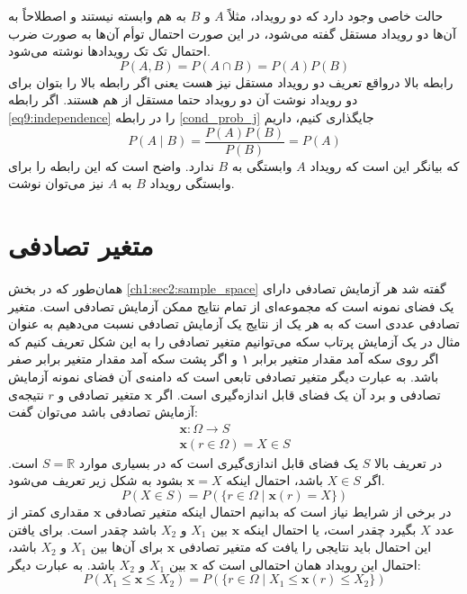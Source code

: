 حالت خاصی وجود دارد که دو رویداد، مثلاً $A$ و $B$ به هم وابسته نیستند و اصطلاحاً به آن‌ها دو رویداد مستقل گفته می‌شود، در این صورت احتمال توأم آن‌ها به صورت ضرب احتمال تک تک رویدادها نوشته می‌شود.
\begin{equation}
    P(A,B) = P(A \cap B) = P(A)P(B)
    \label{eq9:independence}
\end{equation}
رابطه بالا در‌واقع تعریف دو رویداد مستقل نیز هست یعنی اگر رابطه بالا را بتوان برای دو رویداد نوشت آن دو رویداد حتما مستقل از هم هستند. اگر رابطه \ref{eq9:independence} را در رابطه \ref{cond_prob_j} جایگذاری کنیم، داریم
$$P(A \mid B) = \frac{P(A)P(B)}{P(B)} = P(A)$$
که بیانگر این است که رویداد $A$ وابستگی به $B$ ندارد. واضح است که این رابطه را برای وابستگی رویداد $‌B$ به $A$ نیز می‌توان نوشت.\cite{taylor_introduction_1998}


\section{متغیر تصادفی}
\label{ch1:sec5:random_variable}

همان‌طور که در بخش \ref{ch1:sec2:sample_space} گفته شد هر آزمایش تصادفی دارای یک فضای نمونه است که مجموعه‌ای از تمام نتایج ممکن آزمایش تصادفی است. متغیر تصادفی عددی است که به هر یک از نتایج یک آزمایش تصادفی نسبت می‌دهیم به عنوان مثال در یک آزمایش پرتاب سکه می‌توانیم متغیر تصادفی را به این شکل تعریف کنیم که اگر روی سکه آمد مقدار متغیر برابر ۱ و اگر پشت سکه آمد مقدار متغیر برابر صفر باشد.
به عبارت دیگر متغیر تصادفی تابعی است که دامنه‌ی آن فضای نمونه آزمایش تصادفی و برد آن یک فضای قابل اندازه‌گیری است. اگر $\mathbf{x}$ متغیر تصادفی و $r$ نتیجه‌ی آزمایش تصادفی باشد می‌توان گفت:
$$
\begin{array}{l}
    \mathbf{x}:\Omega \rightarrow S \\
    \mathbf{x}(r\in \Omega) = X \in S
\end{array}
$$
در تعریف بالا $S$ یک فضای قابل اندازی‌گیری است که در بسیاری موارد $S=\mathbb{R}$ است. اگر $X \in S$ باشد، احتمال اینکه $\mathbf{x}=X$ بشود به شکل زیر تعریف می‌شود.
$$
P(X \in S) = P(\{ r \in \Omega \mid \mathbf{x}(r) = X \})
$$
در برخی از شرایط نیاز است که بدانیم احتمال اینکه متغیر تصادفی $\mathbf{x}$ مقداری کمتر از عدد $X$ بگیرد چقدر است، یا احتمال اینکه $\mathbf{x}$ بین $X_1$ و $X_2$ باشد چقدر است. برای یافتن این احتمال باید نتایجی را یافت که متغیر تصادفی $\mathbf{x}$ برای آن‌ها بین $X_1$ و $X_2$ باشد، احتمال این رویداد همان احتمالی است که $\mathbf{x}$ بین $X_1$ و $X_2$ باشد. به عبارت دیگر:
$$
P(X_1 \leq \mathbf{x} \leq X_2) = P(\{ r \in \Omega  \mid X_1 \leq  \mathbf{x}(r) \leq X_2 \})
$$

